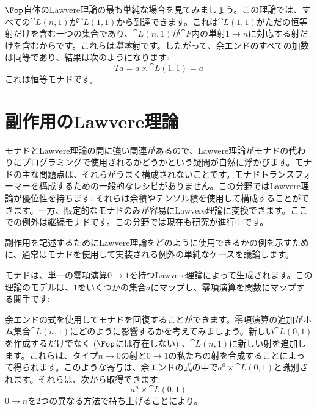 $\Fop$自体のLawvere理論の最も単純な場合を見てみましょう。この理論では、すべての$\cat{L}(n, 1)$が$\cat{L}(1, 1)$から到達できます。これは$\cat{L}(1, 1)$がただの恒等射だけを含む一つの集合であり、$\cat{L}(n, 1)$が$\cat{F}$内の単射$1 \to n$に対応する射だけを含むからです。これらは\emph{基本}射です。したがって、余エンドのすべての加数は同等であり、結果は次のようになります: 
\[T a = a \times \cat{L}(1, 1) = a\]
これは恒等モナドです。

\section{副作用のLawvere理論}

モナドとLawvere理論の間に強い関連があるので、Lawvere理論がモナドの代わりにプログラミングで使用されるかどうかという疑問が自然に浮かびます。モナドの主な問題点は、それらがうまく構成されないことです。モナドトランスフォーマーを構成するための一般的なレシピがありません。この分野ではLawvere理論が優位性を持ちます: それらは余積やテンソル積を使用して構成することができます。一方、限定的なモナドのみが容易にLawvere理論に変換できます。ここでの例外は継続モナドです。この分野では現在も研究が進行中です。

副作用を記述するためにLawvere理論をどのように使用できるかの例を示すために、通常はモナドを使用して実装される例外の単純なケースを議論します。

モナドは、単一の零項演算$0 \to 1$を持つLawvere理論によって生成されます。この理論のモデルは、$1$をいくつかの集合$a$にマップし、零項演算を関数にマップする関手です: 

余エンドの式を使用してモナドを回復することができます。零項演算の追加がホム集合$\cat{L}(n, 1)$にどのように影響するかを考えてみましょう。新しい$\cat{L}(0, 1)$を作成するだけでなく ($\Fop$には存在しない) 、$\cat{L}(n, 1)$に新しい射を追加します。これらは、タイプ$n \to 0$の射と$0 \to 1$の私たちの射を合成することによって得られます。このような寄与は、余エンドの式の中で$a^0 \times \cat{L}(0, 1)$と識別されます。それらは、次から取得できます: 
\[a^n \times \cat{L}(0, 1)\]
$0 \to n$を2つの異なる方法で持ち上げることにより。

\begin{figure}[H]
  \centering
\end{figure}

